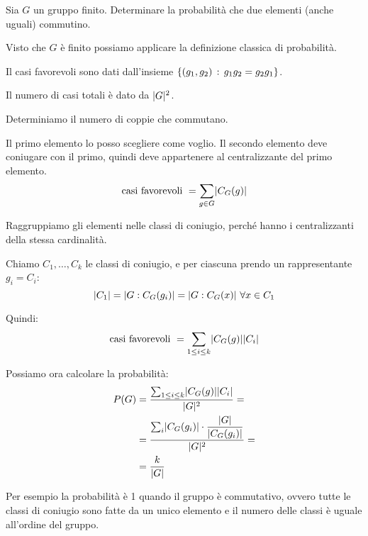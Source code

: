 \begin{esercizio}
    Sia $G$ un gruppo finito.
    Determinare la probabilità che due elementi (anche uguali) commutino.
\end{esercizio}
\begin{soluzione}
    Visto che $G$ è finito possiamo applicare la definizione classica di probabilità.

    Il casi favorevoli sono dati dall'insieme $\{(g_1, g_2) \,:\, g_1 g_2 = g_2 g_1\}$.

    Il numero di casi totali è dato da $\lvert G \rvert^2$.

    Determiniamo il numero di coppie che commutano.

    Il primo elemento lo posso scegliere come voglio.
    Il secondo elemento deve coniugare con il primo, quindi deve appartenere al centralizzante del primo elemento.
    \begin{equation*}
        \text{casi favorevoli } = \sum_{g \in G} \lvert C_G(g) \rvert
    \end{equation*}

    Raggruppiamo gli elementi nelle classi di coniugio, perché hanno i centralizzanti della stessa cardinalità.

    Chiamo $C_1, \dots, C_k$ le classi di coniugio, e per ciascuna prendo un rappresentante $g_i = C_i$:
    \begin{equation*}
        \lvert C_1 \rvert = \lvert G:C_G(g_i) \rvert = \lvert G:C_G(x) \rvert \,\,\forall x \in C_1
    \end{equation*}

    Quindi:
    \begin{equation*}
        \text{casi favorevoli } = \sum_{1 \le i \le k} \lvert C_G(g) \rvert\lvert C_i \rvert
    \end{equation*}

    Possiamo ora calcolare la probabilità:
    \begin{align*}
        P(G) &= \dfrac{ \sum_{1 \le i \le k} \lvert C_G(g) \rvert\lvert C_i \rvert }{ \lvert G \rvert^2 } = \\
        &= \dfrac{ \sum_i \lvert C_G(g_i) \rvert \cdot \dfrac{\lvert G \rvert}{\lvert C_G(g_i) \rvert}}{\lvert G \rvert^2 } = \\
        &= \dfrac{k}{\lvert G \rvert}
    \end{align*}

    Per esempio la probabilità è 1 quando il gruppo è commutativo, ovvero tutte le classi di coniugio sono fatte da
    un unico elemento e il numero delle classi è uguale all'ordine del gruppo.
\end{soluzione}